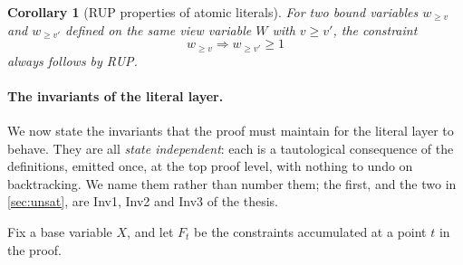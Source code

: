 \documentclass[11pt,a4paper]{article}
\theoremstyle{plain}
\newtheorem{corollaryT}{Corollary}
\theoremstyle{definition}
\theoremstyle{remark}
\newcommand{\atge}[2]{#1_{\geq #2}}
\begin{document}
\begin{corollaryT}[RUP properties of atomic literals]
\label{cor:chainrup}
For two bound variables $\atge{w}{v}$ and $\atge{w}{v'}$ defined on the same
view variable $W$ with $v\geq v'$, the constraint
\begin{equation}
  \atge{w}{v} \Rightarrow \atge{w}{v'} \geq 1
  \label{eq:chainlink}
\end{equation}
always follows by RUP.
\end{corollaryT}

\paragraph{The invariants of the literal layer.}
We now state the invariants that the proof must maintain for the literal layer
to behave.  They are all \emph{state independent}: each is a tautological
consequence of the definitions, emitted once, at the top proof level, with
nothing to undo on backtracking.  We name them rather than number them; the
first, and the two in \cref{sec:unsat}, are Inv1, Inv2 and Inv3 of the thesis.

Fix a base variable $X$, and let $F_t$ be the constraints accumulated at a point
$t$ in the proof.
\end{document}
